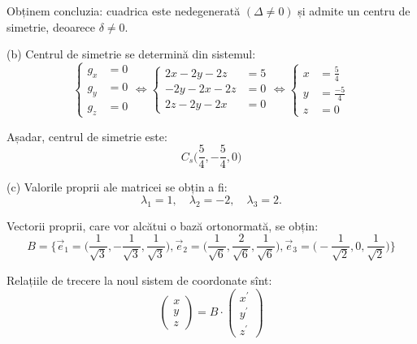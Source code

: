 Obținem concluzia: cuadrica este nedegenerată $(\Delta \neq 0)$ și admite un
centru de simetrie, deoarece $\delta \neq 0$.

(b) Centrul de simetrie se determină din sistemul: 
 \[
	\begin{cases}	
	    g_x &= 0 \\
	    g_y &= 0 \\
	    g_z &= 0
    \end{cases} \Longleftrightarrow 
    \begin{cases}	
	    2x - 2y - 2z &= 5 \\
	    -2y - 2x - 2z &= 0\\
        2z - 2y - 2x &= 0
    \end{cases} \Longleftrightarrow 
    \begin{cases}	
	    x &= \frac{5}{4} \\
	    y &= \frac{-5}{4} \\
	    z &= 0
    \end{cases}
\]

Așadar, centrul de simetrie este: \[
    C_s\Big( \dfrac{5}{4}, - \dfrac{5}{4}, 0 \Big)
\]

(c) Valorile proprii ale matricei se obțin a fi: 
 \[
	\lambda_1 = 1, \quad \lambda_2 = -2, \quad \lambda_3 = 2.
\]

Vectorii proprii, care vor alcătui o bază ortonormată, se obțin: 
 \[
	B = \Big\{ \vec{e}_1 = \Big( \dfrac{1}{\sqrt{3}},
	                            -\dfrac{1}{\sqrt{3}},
	                             \dfrac{1}{\sqrt{3}} \Big),
	           \vec{e}_2 = \Big( \dfrac{1}{\sqrt{6}},
	                             \dfrac{2}{\sqrt{6}},
	                              \dfrac{1}{\sqrt{6}}\Big),
	            \vec{e}_3 = \Big( -\dfrac{1}{\sqrt{2}}, 
	                                0,
	                               \dfrac{1}{\sqrt{2}} \Big) \Big\}
\]

Relațiile de trecere la noul sistem de coordonate sînt: 
 \[
	\begin{pmatrix}
	    x \\ y \\ z
    \end{pmatrix} = B \cdot \begin{pmatrix}
	                            x^{\prime} \\
	                            y^{\prime} \\
	                            z^{\prime}
                            \end{pmatrix}
\]

